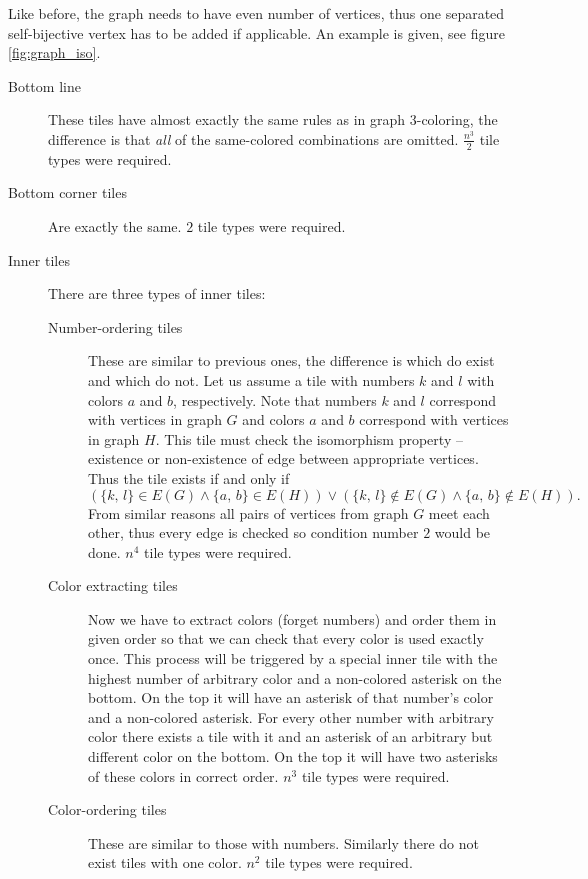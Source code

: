 Like before, the graph needs to have even number of vertices, thus one separated self-bijective vertex has to be added if applicable. An example is given, see figure \ref{fig:graph_iso}.
\begin{description}
	\item[Bottom line] These tiles have almost exactly the same rules as in graph 3-coloring, the difference is that {\em all} of the same-colored combinations are omitted. $\frac{n^3}{2}$ tile types were required.
	\item[Bottom corner tiles] Are exactly the same. $2$ tile types were required.
	\item[Inner tiles] There are three types of inner tiles:
	\begin{description}
		\item[Number-ordering tiles] These are similar to previous ones, the difference is which do exist and which do not. Let us assume a tile with numbers $k$ and $l$ with colors $a$ and $b$, respectively. Note that numbers $k$ and $l$ correspond with vertices in graph $G$ and colors $a$ and $b$ correspond with vertices in graph $H$. This tile must check the isomorphism property -- existence or non-existence of edge between appropriate vertices. Thus the tile exists if and only if
		$$(\{k,\,l\} \in E(G) \wedge \{a,\,b\} \in E(H)) \vee (\{k,\,l\} \notin E(G) \wedge \{a,\,b\} \notin E(H)) . $$
		From similar reasons all pairs of vertices from graph $G$ meet each other, thus every edge is checked so condition number $2$ would be done. $n^4$ tile types were required.
		\item[Color extracting tiles] Now we have to extract colors (forget numbers) and order them in given order so that we can check that every color is used exactly once. This process will be triggered by a special inner tile with the highest number of arbitrary color and a non-colored asterisk on the bottom. On the top it will have an asterisk of that number's color and a non-colored asterisk. For every other number with arbitrary color there exists a tile with it and an asterisk of an arbitrary but different color on the bottom. On the top it will have two asterisks of these colors in correct order. $n^3$ tile types were required.
		\item[Color-ordering tiles] These are similar to those with numbers. Similarly there do not exist tiles with one color. $n^2$ tile types were required.

\end{description}
\end{description}
